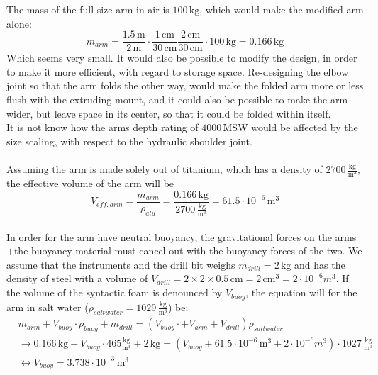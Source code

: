The mass of the full-size arm in air is $100\,\mathrm{kg}$, which would make the modified arm alone:
\begin{equation}
m_{arm}=\frac{1.5\,\mathrm{m}}{2\,\mathrm{m}}\cdot\frac{1\,\mathrm{cm}}{30\,\mathrm{cm}}\frac{2\,\mathrm{cm}}{30\,\mathrm{cm}}\cdot 100\,\mathrm{kg}=0.166\,\mathrm{kg}
\end{equation}
Which seems very small. It would also be possible to modify the design, in order to make it more efficient, with regard to storage space. Re-designing the elbow joint so that the arm folds the other way, would make the folded arm more or less flush with the extruding mount, and it could also be possible to make the arm wider, but leave space in its center, so that it could be folded within itself.\\
It is not know how the arms depth rating of $4000\,\mathrm{MSW}$ would be affected by the size scaling, with respect to the hydraulic shoulder joint.\\
\\
Assuming the arm is made solely out of titanium, which has a density of $2700\,\frac{\mathrm{kg}}{\mathrm{m^3}}$, the effective volume of the arm will be 
\begin{equation}
V_{eff,arm}=\frac{m_{arm}}{\rho_{alu}}=\frac{0.166\,\mathrm{kg}}{2700\,\mathrm{\frac{kg}{m^3}}}=61.5\cdot 10^{-6} \, \mathrm{m^3}
\end{equation}
\\
In order for the arm have neutral buoyancy, the gravitational forces on the arms$+$the buoyancy material must cancel out with the buoyancy forces of the two. We assume that the instruments and the drill bit weighs $m_{drill}=2\,\mathrm{kg}$ and has the density of steel with a volume of $V_{drill}=2\times 2 \times 0.5 \, \mathrm{cm}=2\,\mathrm{cm^3}=2\cdot 10^{-6}m^3$. If the volume of the syntactic foam is denounced by $V_{buoy}$, the equation will for the arm in salt water ($\rho_{saltwater}=1029 \, \mathrm{\frac{kg}{m^3}}$) be:
\begin{equation}
\begin{split}
&m_{arm}+V_{buoy}\cdot \rho_{buoy} + m_{drill}=(V_{buoy}\cdot + V_{arm}+V_{drill})\rho_{saltwater}\\
&\rightarrow 0.166\,\mathrm{kg}+V_{buoy}\cdot 465 \mathrm{\frac{kg}{m^3}}+2\,\mathrm{kg}=(V_{buoy}+61.5\cdot 10^{-6}\,\mathrm{m^3}+2\cdot 10^{-6}m^3)\cdot 1027 \,\mathrm{\frac{kg}{m^3}}\\
& \leftrightarrow V_{buoy} = 3.738\cdot 10^{-3}\,\mathrm{m^3}
\end{split}
\end{equation}
